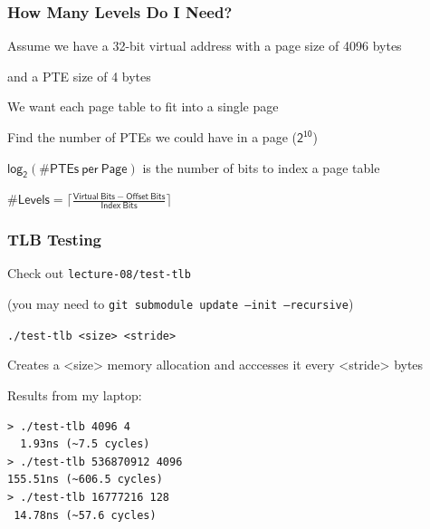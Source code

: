   \begin{frame}
    \frametitle{How Many Levels Do I Need?}

    Assume we have a 32-bit virtual address with a page size of 4096 bytes

    \hspace{2em} and a PTE size of 4 bytes

    \vspace{2em}

    We want each page table to fit into a single page

    \hspace{2em} Find the number of PTEs we could have in a page ($\mathsf{2^{10}}$)

    \hspace{4em} $\mathsf{log_2(\# PTEs\ per\ Page)}$ is the number of bits to index a page table

    \vspace{2em}

    $\mathsf{\# Levels = \lceil \frac{Virtual\ Bits - Offset\ Bits}{Index\ Bits} \rceil}$

    \vspace{2em}

  \end{frame}

  \begin{frame}[fragile]
    \frametitle{TLB Testing}

    Check out \texttt{lecture-08/test-tlb}

    \hspace{2em} (you may need to \texttt{git submodule update --init --recursive})

    \vspace{2em}

    \texttt{./test-tlb <size> <stride>}

    \hspace{2em} Creates a <size> memory allocation and acccesses it every <stride> bytes

    \vspace{2em}

    Results from my laptop:

    \begin{lstlisting}
> ./test-tlb 4096 4        
  1.93ns (~7.5 cycles)
> ./test-tlb 536870912 4096
155.51ns (~606.5 cycles)
> ./test-tlb 16777216 128  
 14.78ns (~57.6 cycles)
    \end{lstlisting}
  \end{frame}

